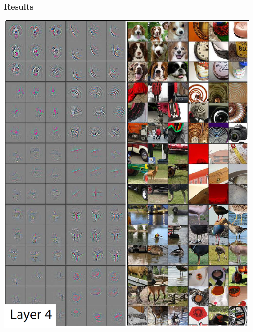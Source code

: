 \begin{frame}
	\frametitle{Results}
	
	\begin{center}
		\includegraphics[scale=0.5]{figs/ZFnet_layer4}
	\end{center}
\end{frame}

